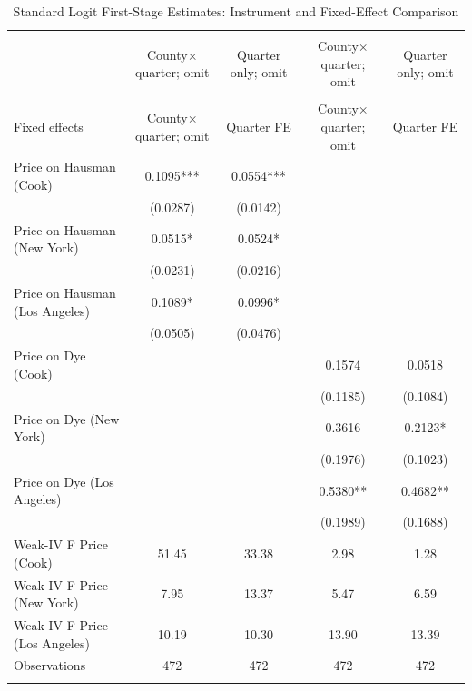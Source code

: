 \begin{table}[!htbp] \centering
  \caption{Standard Logit First-Stage Estimates: Instrument and Fixed-Effect Comparison}
  \label{tab:standard_iv_comparison_first_stage}
  \begin{tabular}{lcccc}
\\[-1.8ex]\hline
\hline \\[-1.8ex]
 & County$\times$quarter; omit & Quarter only; omit & County$\times$quarter; omit & Quarter only; omit \\
\hline \\[-1.8ex]
Fixed effects & County$\times$quarter; omit & Quarter FE & County$\times$quarter; omit & Quarter FE \\
Price on Hausman (Cook) & 0.1095*** & 0.0554*** &  &  \\
 & (0.0287) & (0.0142) &  &  \\
Price on Hausman (New York) & 0.0515* & 0.0524* &  &  \\
 & (0.0231) & (0.0216) &  &  \\
Price on Hausman (Los Angeles) & 0.1089* & 0.0996* &  &  \\
 & (0.0505) & (0.0476) &  &  \\
Price on Dye (Cook) &  &  & 0.1574 & 0.0518 \\
 &  &  & (0.1185) & (0.1084) \\
Price on Dye (New York) &  &  & 0.3616 & 0.2123* \\
 &  &  & (0.1976) & (0.1023) \\
Price on Dye (Los Angeles) &  &  & 0.5380** & 0.4682** \\
 &  &  & (0.1989) & (0.1688) \\
Weak-IV F Price (Cook) & 51.45 & 33.38 & 2.98 & 1.28 \\
Weak-IV F Price (New York) & 7.95 & 13.37 & 5.47 & 6.59 \\
Weak-IV F Price (Los Angeles) & 10.19 & 10.30 & 13.90 & 13.39 \\
Observations & 472 & 472 & 472 & 472 \\
\hline \\[-1.8ex]

\end{tabular}
\end{table}
